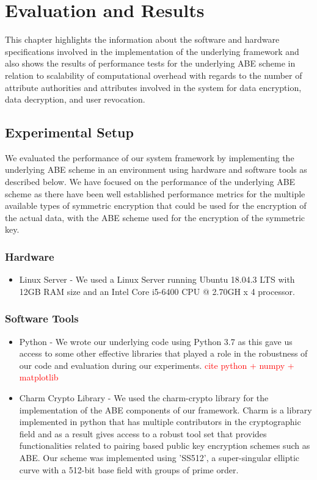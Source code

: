 \chapter{Evaluation and Results}
\label{chap:evaluation_and_results}

This chapter highlights the information about the software and hardware specifications involved in the implementation of the underlying framework and also shows the results of performance tests for the underlying ABE scheme in relation to scalability of computational overhead with regards to the number of attribute authorities and attributes involved in the system for data encryption, data decryption, and user revocation.

\section{Experimental Setup}

We evaluated the performance of our system framework by implementing the underlying ABE scheme in an environment using hardware and software tools as described below. We have focused on the performance of the underlying ABE scheme as there have been well established performance metrics for the multiple available types of symmetric encryption that could be used for the encryption of the actual data, with the ABE scheme used for the encryption of the symmetric key. 

\subsection{Hardware}
\begin{itemize}
	\item Linux Server - We used a Linux Server running Ubuntu 18.04.3 LTS with 12GB RAM size and an Intel Core i5-6400 CPU @ 2.70GH x 4 processor.
\end{itemize}

\subsection{Software Tools}
\begin{itemize}
	\item Python - We wrote our underlying code using Python 3.7 as this gave us access to some other effective libraries that played a role in the robustness of our code and evaluation during our experiments. \textcolor{red}{cite python + numpy + matplotlib}
	
	\item Charm Crypto Library\cite{charm13crypto} - We used the charm-crypto library for the implementation of the ABE components of our framework. Charm is a library implemented in python that has multiple contributors in the cryptographic field and as a result gives access to a robust tool set that provides functionalities related to pairing based public key encryption schemes such as ABE. Our scheme was implemented using 'SS512', a super-singular elliptic curve with a 512-bit base field with groups of prime order.
\end{itemize}

